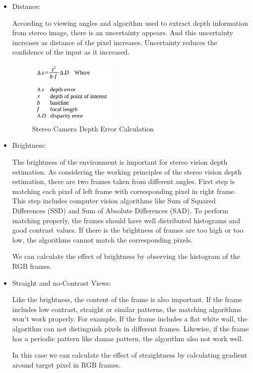 \documentclass[12pt]{article}
\begin{document}
\begin{itemize}
    \item Distance:
          
          According to viewing angles and algorithm used to extract depth information from stereo image, there is an uncertainty appears. And this uncertainty increases as distance of the pixel increases. Uncertainty reduces the confidence of the input as it increased.
          
          \begin{figure}[H]
              \centering
              \includegraphics[width=0.4\textwidth]{CamDistance.png}
              \caption{Stereo Camera Depth Error Calculation~\cite{DisparityCalculator, gallup2008variable}}
          \end{figure}
          
    \item Brightness:
          
          The brightness of the environment is important for stereo vision depth estimation. As considering the working principles of the stereo vision depth estimation, there are two frames taken from different angles. First step is matching each pixel of left frame with corresponding pixel in right frame. This step includes computer vision algorithms like Sum of Squared Differences (SSD) and Sum of Absolute Differences (SAD). To perform matching properly, the frames should have well distributed histograms and good contrast values. If there is the brightness of frames are too high or too low, the algorithms cannot match the corresponding pixels.
          
          We can calculate the effect of brightness by observing the histogram of the RGB frames.
    \item Straight and no-Contrast Views:
          
          Like the brightness, the content of the frame is also important. If the frame includes low contrast, straight or similar patterns, the matching algorithms won’t work properly. For example, If the frame includes a flat white wall, the algorithm can not distinguish pixels in different frames. Likewise, if the frame has a periodic pattern like damas pattern, the algorithm also not work well.
          
          In this case we can calculate the effect of straightness by calculating gradient around target pixel in RGB frames.
\end{itemize}
\end{document}
